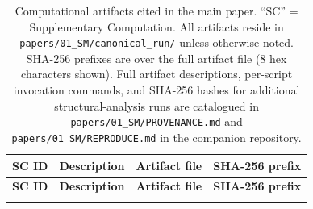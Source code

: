 \documentclass[10pt]{article}
\begin{document}
\begin{longtable}{@{} p{1.4cm} p{5.0cm} p{4.0cm} p{3.4cm} @{}}
\caption{Computational artifacts cited in the main paper.  ``SC'' = Supplementary Computation.  All artifacts reside in \texttt{papers/01\_SM/canonical\_run/} unless otherwise noted.  SHA-256 prefixes are over the full artifact file (8 hex characters shown).  Full artifact descriptions, per-script invocation commands, and SHA-256 hashes for additional structural-analysis runs are catalogued in \texttt{papers/01\_SM/PROVENANCE.md} and \texttt{papers/01\_SM/REPRODUCE.md} in the companion repository.}
\label{tab:si_manifest} \\
\toprule
\textbf{SC ID} & \textbf{Description} & \textbf{Artifact file} & \textbf{SHA-256 prefix} \\
\midrule
\endfirsthead
\toprule
\textbf{SC ID} & \textbf{Description} & \textbf{Artifact file} & \textbf{SHA-256 prefix} \\
\midrule
\endhead
\bottomrule
\endfoot


\end{longtable}
\end{document}
